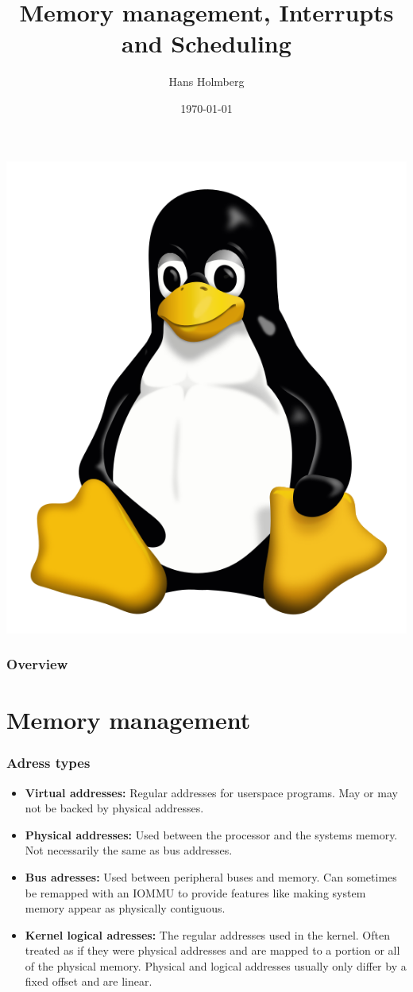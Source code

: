 \documentclass{beamer}
\title[TLKDCC Memory, Interrupts, Scheduling]{Memory management, Interrupts and Scheduling}
\author{Hans Holmberg}
\institute[LKTP]
{
Linux Kernel Teaching Project \\ 
\medskip
\textit{hans.holmberg@gmail.com}
}
\date{\today}
\begin{document}
\begin{frame}
\titlepage
\includegraphics{../common/tux} 
\end{frame}

\begin{frame}
\frametitle{Overview}
\tableofcontents 
\end{frame}

\section{Memory management}

\begin{frame}
\frametitle{Adress types}
\begin{itemize}
	\item \textbf{Virtual addresses:} Regular addresses for userspace programs. May or may not be backed by physical addresses.
	\item \textbf{Physical addresses:} Used between the processor and the systems memory. Not necessarily the same as bus addresses.
	\item \textbf{Bus adresses:} Used between peripheral buses and memory. Can sometimes be remapped with an IOMMU to provide features like making system memory appear as physically contiguous. 
	\item \textbf{Kernel logical adresses:} The regular addresses used in the kernel. Often treated as if they were physical addresses and are mapped to a portion or all of the physical memory. Physical and logical addresses usually only differ by a fixed offset and are linear.
\end{itemize}
\end{frame}
\end{document}
